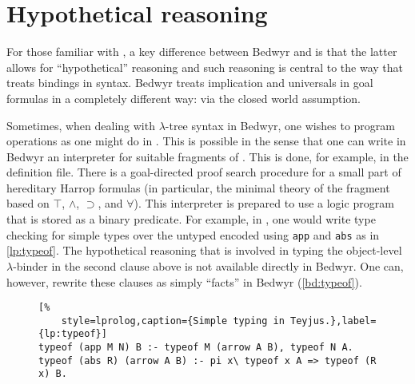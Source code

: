 \section{Hypothetical reasoning}

For those familiar with \lp{}, a key difference between Bedwyr and \lp{}
is that the latter allows for ``hypothetical'' reasoning and such
reasoning is central to the way that \lp{} treats bindings in syntax.
Bedwyr treats implication and universals in goal formulas in a
completely different way: via the closed world assumption.

Sometimes, when dealing with $\lambda$-tree syntax in Bedwyr, one
wishes to program operations as one might do in \lp{}.  This is possible
in the sense that one can write in Bedwyr an interpreter for suitable
fragments of \lp{}.  This is done, for example, in the 
definition file.  There is a goal-directed proof search procedure for a
small part of hereditary Harrop formulas (in particular, the minimal
theory of the fragment based on $\top$, $\land$, $\supset$, and
$\forall$).  This interpreter is prepared to use a logic program that
is stored as a binary predicate.  For example, in \lp{}, one would write
type checking for simple types over the untyped \lc{}
encoded using \lstinline{app} and \lstinline{abs} as in \autoref{lp:typeof}.
The hypothetical reasoning that is involved in typing the object-level
$\lambda$-binder in the second clause above is not available directly
in Bedwyr.  One can, however, rewrite these clauses as simply
``facts'' in Bedwyr (\autoref{bd:typeof}).

\begin{figure}
  \centering
  \begin{lstlisting}[%
    style=lprolog,caption={Simple typing in Teyjus.},label={lp:typeof}]
typeof (app M N) B :- typeof M (arrow A B), typeof N A.
typeof (abs R) (arrow A B) :- pi x\ typeof x A => typeof (R x) B.
  \end{lstlisting}
\end{figure}
\begin{figure}
  \centering
  
\end{figure}

